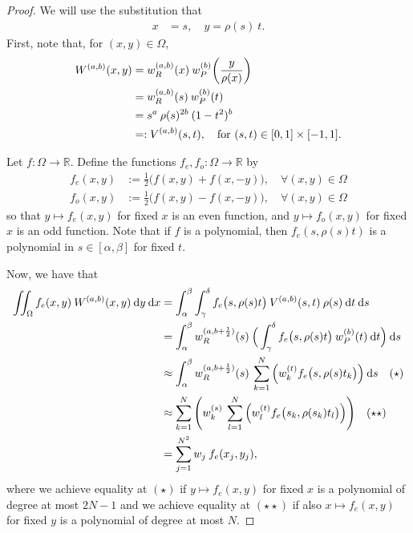 \documentclass[11pt, oneside]{article}   	%
\newcommand{\half}{\frac{1}{2}}
\newcommand{\R}{\mathbb{R}}
\newcommand{\Wab}{{W^{(a,b)}}}
\newcommand{\genjac}{R}
\newcommand{\genjacw}{w_\genjac}
\newcommand{\jacw}{w_P}
\begin{document}
\begin{proof}
We will use the substitution that
\begin{align*}
	x &= s, \quad y = \rho(s) \: t.
\end{align*}
First, note that, for $(x,y) \in \Omega$,
\begin{align*}
	W^{(a,b)}(x,y) &= \genjacw^{(a,b)}(x) \: \jacw^{(b)}\fpr(\frac{y}{\rho(x)}) \\
	&= \genjacw^{(a,b)}(s) \: \jacw^{(b)}(t) \\
	&= s^a \: \rho(s)^{2b} \: (1-t^2)^b \\
	&=: V^{(a,b)}(s,t), \quad \text{for } (s,t) \in [0,1] \times [-1,1].
\end{align*}

Let $f : \Omega \to \R$. Define the functions $f_e, f_o : \Omega \to \R$ by 
\begin{align*}
	f_e(x,y) &:= \half \Big(f(x, y) + f(x, -y)\Big), \quad \forall (x,y) \in \Omega\\
	f_o(x,y) &:= \half \Big(f(x, y) - f(x, -y)\Big), \quad \forall (x,y) \in \Omega
\end{align*}
so that $y \mapsto f_e(x,y)$ for fixed $x$ is an even function, and $y \mapsto f_o(x,y)$ for fixed $x$ is an odd function. Note that if $f$ is a polynomial, then $f_e(s, \rho(s)t)$ is a polynomial in $s \in [\alpha,\beta]$ for fixed $t$. 

Now, we have that
\begin{align*}
	\iint_\Omega f_e(x,y) \: \Wab(x,y) \: \D y \: \D x &= \int_\alpha^\beta \int_\gamma^\delta f_e\big(s,\rho(s) t\big) \: V^{(a,b)}(s,t) \: \rho(s) \: \D t \: \D s \\
	&= \int_\alpha^\beta  \genjacw^{(a,b+\half)}(s) \: \Big( \int_\gamma^\delta f_e\big(s,\rho(s) t\big) \: \jacw^{(b)}(t) \: \D t \Big) \: \D s \\
	&\approx \int_\alpha^\beta  \genjacw^{(a,b+\half)}(s) \: \sum_{k=1}^N \Big( w_k^{(t)} f_e\big(s,\rho(s) t_k\big) \Big) \: \D s \quad (\star) \\
	&\approx \sum_{k=1}^N \Bigg( w_k^{(s)} \: \sum_{l=1}^N \Big( w_l^{(t)} f_e\big(s_k,\rho(s_k) t_l\big) \Big) \Bigg) \quad (\star \star) \\
	&= \sum_{j=1}^{N^2}  w_j \: f_e(x_j, y_j),
\end{align*}
where we achieve equality at $(\star)$ if $y \mapsto f_e(x,y)$ for fixed $x$ is a polynomial of degree at most $2N-1$ and we achieve equality at $(\star \star)$ if also $x \mapsto f_e(x,y)$ for fixed $y$ is a polynomial of degree at most $N$. 


\end{proof}
\end{document}
